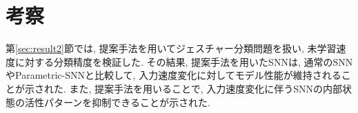 \section{考察}
第\ref{sec:result2}節では, 提案手法を用いてジェスチャー分類問題を扱い, 未学習速度に対する分類精度を検証した.
その結果, 提案手法を用いたSNNは, 通常のSNNやParametric-SNNと比較して, 入力速度変化に対してモデル性能が維持されることが示された.
また, 提案手法を用いることで, 入力速度変化に伴うSNNの内部状態の活性パターンを抑制できることが示された.




\clearpage